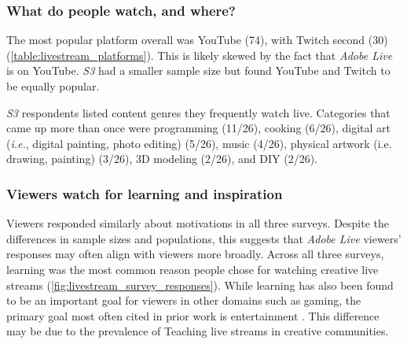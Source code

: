 \subsubsection{What do people watch, and where?}
The most popular platform overall was YouTube (74), with Twitch second (30) (\autoref{table:livestream_platforms}). This is likely skewed by the fact that \textit{Adobe Live} is on YouTube. \textit{S3} had a smaller sample size but found YouTube and Twitch to be equally popular.

\textit{S3} respondents listed content genres they frequently watch live. Categories that came up more than once were programming (11/26), cooking (6/26), digital art (\emph{i.e.}, digital painting, photo editing) (5/26), music (4/26), physical artwork (i.e. drawing, painting) (3/26), 3D modeling (2/26), and DIY (2/26).

\subsubsection{Viewers watch for learning and inspiration}
Viewers responded similarly about motivations in all three surveys. Despite the differences in sample sizes and populations, this suggests that \textit{Adobe Live} viewers' responses may often align with viewers more broadly. Across all three surveys, learning was the most common reason people chose for watching creative live streams (\autoref{fig:livestream_survey_responses}). While learning has also been found to be an important goal for viewers in other domains such as gaming, the primary goal most often cited in prior work is entertainment \cite{Lu2019, Wohn2018, Lu2018a, Hilvert-Bruce2018, Faas2018, Cheung2011}.
This difference may be due to the prevalence of Teaching live streams in creative communities.


